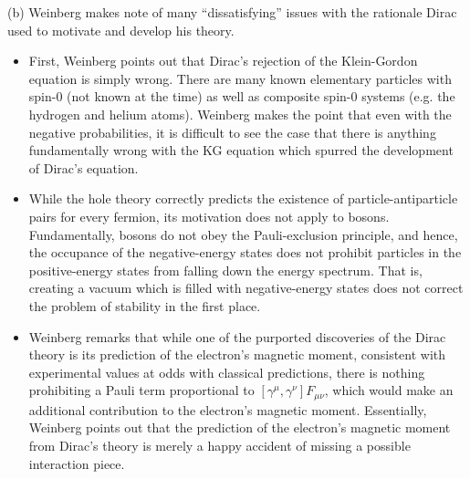 (b) Weinberg makes note of many ``dissatisfying'' issues with the rationale Dirac used to motivate and develop his theory.

\begin{itemize}

    \item First, Weinberg points out that Dirac's rejection of the Klein-Gordon equation is simply wrong. There are many known elementary particles with spin-0 (not known at the time) as well as composite spin-0 systems (e.g. the hydrogen and helium atoms). Weinberg makes the point that even with the negative probabilities, it is difficult to see the case that there is anything fundamentally wrong with the KG equation which spurred the development of Dirac's equation.

    \item While the hole theory correctly predicts the existence of particle-antiparticle pairs for every fermion, its motivation does not apply to bosons. Fundamentally, bosons do not obey the Pauli-exclusion principle, and hence, the occupance of the negative-energy states does not prohibit particles in the positive-energy states from falling down the energy spectrum. That is, creating a vacuum which is filled with negative-energy states does not correct the problem of stability in the first place.

    \item Weinberg remarks that while one of the purported discoveries of the Dirac theory is its prediction of the electron's magnetic moment, consistent with experimental values at odds with classical predictions, there is nothing prohibiting a Pauli term proportional to $[\gamma^{\mu},\gamma^{\nu}] F_{\mu\nu}$, which would make an additional contribution to the electron's magnetic moment. Essentially, Weinberg points out that the prediction of the electron's magnetic moment from Dirac's theory is merely a happy accident of missing a possible interaction piece. 
    
\end{itemize}
    


